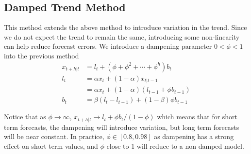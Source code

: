 \documentclass[../../time_series_notes.tex]{subfiles}
\begin{document}
\subsection{Damped Trend Method}
This method extends the above method to introduce variation in the trend. Since we do not expect the trend to remain the same, introducing some non-linearity can help reduce forecast errors. We introduce a dampening parameter $0 < \phi < 1$ into the previous method
\begin{align*}
    x_{t+h|t} &= l_{t} + (\phi + \phi^{2} + \cdots + \phi^{h})b_{t}\\
    l_{t} &= \alpha x_{t} + (1-\alpha)x_{t|t-1}\\
    &= \alpha x_{t} + (1-\alpha)(l_{t-1} + \phi b_{t-1})\\
    b_{t} &= \beta(l_{t} - l_{t-1}) + (1-\beta)\phi b_{t-1}    
\end{align*}

Notice that as $\phi \to \infty$, $x_{t+h|t} \to l_{t} + \phi b_{t}/(1-\phi)$ which means that for short term forecasts, the dampening will introduce variation, but long term forecasts will be near constant.  In practice, $\phi \in [0.8, 0.98]$ as dampening has a strong effect on short term values, and $\phi$ close to 1 will reduce to a non-damped model.
\end{document}
